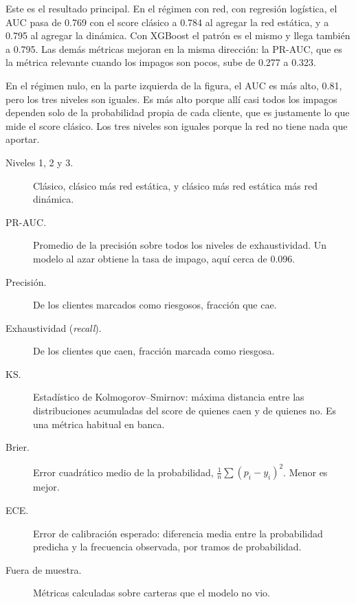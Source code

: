 \begin{decir}
Este es el resultado principal. En el régimen con red, con regresión logística, el AUC
pasa de 0.769 con el score clásico a 0.784 al agregar la red estática, y a 0.795 al
agregar la dinámica. Con XGBoost el patrón es el mismo y llega también a 0.795. Las
demás métricas mejoran en la misma dirección: la PR-AUC, que es la métrica relevante
cuando los impagos son pocos, sube de 0.277 a 0.323.

En el régimen nulo, en la parte izquierda de la figura, el AUC es más alto, 0.81, pero
los tres niveles son iguales. Es más alto porque allí casi todos los impagos dependen
solo de la probabilidad propia de cada cliente, que es justamente lo que mide el score
clásico. Los tres niveles son iguales porque la red no tiene nada que aportar.
\end{decir}
\begin{terminos}
\begin{description}
\item[Niveles 1, 2 y 3.] Clásico, clásico más red estática, y clásico más red estática
más red dinámica.
\item[PR-AUC.] Promedio de la precisión sobre todos los niveles de exhaustividad. Un
modelo al azar obtiene la tasa de impago, aquí cerca de 0.096.
\item[Precisión.] De los clientes marcados como riesgosos, fracción que cae.
\item[Exhaustividad (\emph{recall}).] De los clientes que caen, fracción marcada como
riesgosa.
\item[KS.] Estadístico de Kolmogorov–Smirnov: máxima distancia entre las distribuciones
acumuladas del score de quienes caen y de quienes no. Es una métrica habitual en banca.
\item[Brier.] Error cuadrático medio de la probabilidad, $\frac1n\sum(p_i-y_i)^2$.
Menor es mejor.
\item[ECE.] Error de calibración esperado: diferencia media entre la probabilidad
predicha y la frecuencia observada, por tramos de probabilidad.
\item[Fuera de muestra.] Métricas calculadas sobre carteras que el modelo no vio.
\end{description}
\end{terminos}
\begin{preguntas}
\end{preguntas}

